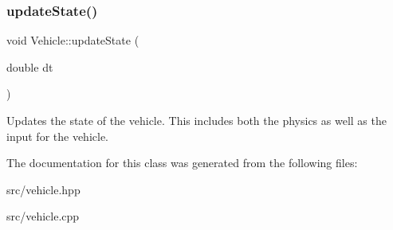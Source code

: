 \subsubsection{\texorpdfstring{update\+State()}{updateState()}}
{\footnotesize\ttfamily void Vehicle\+::update\+State (\begin{DoxyParamCaption}\item[{double}]{dt }\end{DoxyParamCaption})}

Updates the state of the vehicle. This includes both the physics as well as the input for the vehicle. 

The documentation for this class was generated from the following files\+:\begin{DoxyCompactItemize}
\item 
src/vehicle.\+hpp\item 
src/vehicle.\+cpp\end{DoxyCompactItemize}
